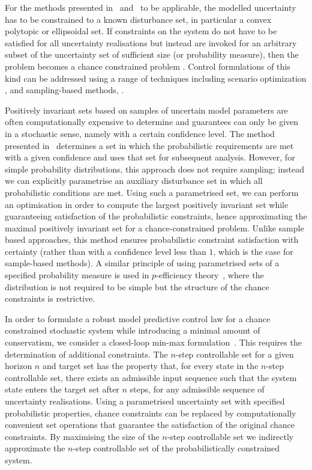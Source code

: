\documentclass{ifacconf}
\begin{document}
For the methods presented in~\cite{Kolmanovsky:1998} and~\cite{blanchini:2007} to be applicable, the modelled uncertainty has to be constrained to a known disturbance set, in particular a convex polytopic or ellipsoidal set.
%
If constraints on the system do not have to be satisfied for all uncertainty realisations but instead are invoked for an arbitrary subset of the uncertainty set of sufficient size (or probability measure), then the problem becomes a chance constrained problem \cite[see e.g.][]{Kall1994}.
%
Control formulations of this kind can be addressed using a range of techniques including scenario optimization \citep[e.g.][]{Calafiore2010}, and sampling-based methods, \citep[e.g.][]{Margellos2014,Zhang2015,Fleming2016}.
%

Positively invariant sets based on samples of uncertain model parameters are often computationally expensive to determine and guarantees can only be given in a stochastic sense, namely with a certain confidence level.
%
The method presented in~\cite{Zhang2015} determines a set in which the probabilistic requirements are met with a given confidence and uses that set for subsequent analysis.
%
However, for simple probability distributions, this approach does not require sampling; instead we can explicitly parametrise an auxiliary disturbance set in which all probabilistic conditions are met.
%
Using such a parametrised set, we can perform an optimisation
in order to compute the largest positively invariant set while guaranteeing satisfaction of the probabilistic constraints, hence approximating the maximal positively invariant set for a chance-constrained problem.
%
Unlike sample based approaches, this method ensures probabilistic constraint satisfaction with certainty (rather than with a confidence level less than $1$, which is the case for sample-based methods).
%
A similar principle of using parametrised sets of a specified probability measure is used in $p$-efficiency theory~\citep{Dentcheva2009}, where the distribution is not required to be simple but the structure of the chance constraints is restrictive.

In order to formulate a robust model predictive control law for a chance constrained stochastic system while introducing a minimal amount of conservatism, we consider a closed-loop min-max formulation~\citep{Lee:1997}. This requires the determination of additional constraints.
%
The $n$-step controllable set for a given horizon $n$ and target set \citep[see e.g.][]{bertsekas71} has the property that, for every state in the $n$-step controllable set, there exists an admissible input sequence such that the system state enters the target set after $n$ steps, for any admissible sequence of uncertainty realisations.
%
Using a parametrised uncertainty set with specified probabilistic properties, chance constraints can be replaced by computationally convenient set operations that guarantee the satisfaction of the original chance constraints.
%
By maximising the size of the $n$-step controllable set we indirectly approximate the $n$-step controllable set of the probabilistically constrained system.
\end{document}
